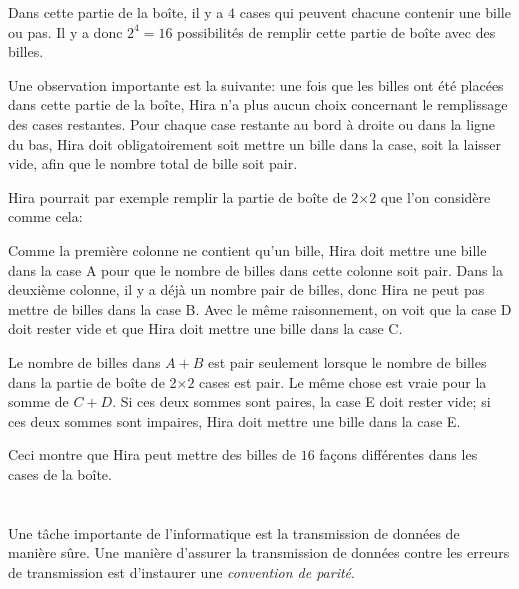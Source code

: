 {{{\centering%
\par}

Dans cette partie de la boîte, il y a $4$ cases qui peuvent chacune contenir une bille ou pas. Il y a donc ${2^4 = 16}$ possibilités de remplir cette partie de boîte avec des billes.

Une observation importante est la suivante: une fois que les billes ont été placées dans cette partie de la boîte, Hira n’a plus aucun choix concernant le remplissage des cases restantes. Pour chaque case restante au bord à droite ou dans la ligne du bas, Hira doit obligatoirement soit mettre un bille dans la case, soit la laisser vide, afin que le nombre total de bille soit pair.

Hira pourrait par exemple remplir la partie de boîte de 2\ensuremath{\times}$2$ que l’on considère comme cela:

{\centering%
\par}

Comme la première colonne ne contient qu’un bille, Hira doit mettre une bille dans la case A pour que le nombre de billes dans cette colonne soit pair. Dans la deuxième colonne, il y a déjà un nombre pair de billes, donc Hira ne peut pas mettre de billes dans la case B. Avec le même raisonnement, on voit que la case D doit rester vide et que Hira doit mettre une bille dans la case C.

{\centering%
\par}

Le nombre de billes dans ${A + B}$ est pair seulement lorsque le nombre de billes dans la partie de boîte de 2\ensuremath{\times}$2$ cases est pair. Le même chose est vraie pour la somme de ${C + D}$. Si ces deux sommes sont paires, la case E doit rester vide; si ces deux sommes sont impaires, Hira doit mettre une bille dans la case E.

{\centering%
\par}

Ceci montre que Hira peut mettre des billes de $16$ façons différentes dans les cases de la boîte.



\section*{\BrochureItsInformatics}
Une tâche importante de l’informatique est la transmission de données de manière sûre. Une manière d’assurer la transmission de données contre les erreurs de transmission est d’instaurer une \emph{convention de parité}.

}}

